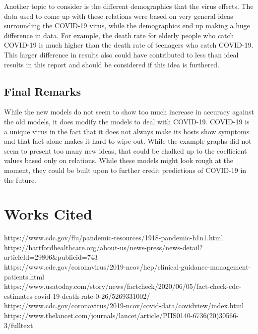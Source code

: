 \documentclass[12pt]{article} %
\begin{document}
Another topic to consider is the different demographics that the virus effects. The data used to come up with these relations were based on very general ideas surrounding the COVID-19 virus, while the demographics end up making a huge difference in data. For example, the death rate for elderly people who catch COVID-19 is much higher than the death rate of teenagers who catch COVID-19. This larger difference in results also could have contributed to less than ideal results in this report and should be considered if this idea is furthered.
\subsection{Final Remarks}
While the new models do not seem to show too much increase in accuracy against the old models, it does modify the models to deal with COVID-19. COVID-19 is a unique virus in the fact that it does not always make its hosts show symptoms and that fact alone makes it hard to wipe out. While the example graphs did not seem to present too many new ideas, that could be chalked up to the coefficient values based only on relations. While these models might look rough at the moment, they could be built upon to further credit predictions of COVID-19 in the future. 
\section{Works Cited}
\begin{center}
https://www.cdc.gov/flu/pandemic-resources/1918-pandemic-h1n1.html\\
https://hartfordhealthcare.org/about-us/news-press/news-detail?articleId=29806\&publicid=743\\
https://www.cdc.gov/coronavirus/2019-ncov/hcp/clinical-guidance-management-patients.html\\
https://www.usatoday.com/story/news/factcheck/2020/06/05/fact-check-cdc-estimates-covid-19-death-rate-0-26/5269331002/\\
https://www.cdc.gov/coronavirus/2019-ncov/covid-data/covidview/index.html\\
https://www.thelancet.com/journals/lancet/article/PIIS0140-6736(20)30566-3/fulltext\\
\end{center}
\end{document}
